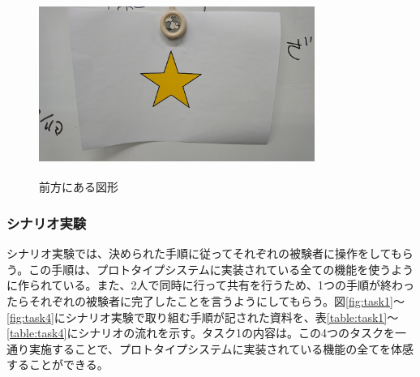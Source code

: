 \documentclass[11pt,a4j, titlepage]{jarticle} %
\begin{document}
\begin{figure}[H]
  \begin{center}
    \includegraphics[clip,height=6.0cm,width=9.0cm]{./hoshi.eps}
    \caption{前方にある図形}
    \label{fig:hoshi}
  \end{center}
\end{figure}

\subsubsection{シナリオ実験}
シナリオ実験では、決められた手順に従ってそれぞれの被験者に操作をしてもらう。この手順は、プロトタイプシステムに実装されている全ての機能を使うように作られている。また、2人で同時に行って共有を行うため、1つの手順が終わったらそれぞれの被験者に完了したことを言うようにしてもらう。図\ref{fig:task1}～\ref{fig:task4}にシナリオ実験で取り組む手順が記された資料を、表\ref{table:task1}～\ref{table:task4}にシナリオの流れを示す。タスク1の内容は。この4つのタスクを一通り実施することで、プロトタイプシステムに実装されている機能の全てを体感することができる。
\end{document}
